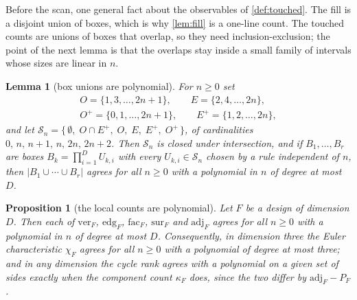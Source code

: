 \documentclass[11pt]{amsart}
\newtheorem{proposition}[theorem]{Proposition}
\newtheorem{lemma}[theorem]{Lemma}
\theoremstyle{definition}
\theoremstyle{remark}
\begin{document}
Before the scan, one general fact about the observables of \cref{def:touched}. The fill is a disjoint union of boxes, which is why \cref{lem:fill} is a one-line count. The touched counts are unions of boxes that overlap, so they need inclusion-exclusion; the point of the next lemma is that the overlaps stay inside a small family of intervals whose sizes are linear in $n$.

\begin{lemma}[box unions are polynomial]
\label{lem:boxes}
For $n \ge 0$ set
\begin{gather*}
  O = \{1,3,\dots,2n+1\},\qquad E = \{2,4,\dots,2n\},\\
  O^{+} = \{0,1,\dots,2n+1\},\qquad E^{+} = \{1,2,\dots,2n\},
\end{gather*}
and let $\mathcal{S}_{n} = \{\,\emptyset,\; O \cap E^{+},\; O,\; E,\; E^{+},\; O^{+}\,\}$, of cardinalities $0,\,n,\,n+1,\,n,\,2n,\,2n+2$. Then $\mathcal{S}_{n}$ is closed under intersection, and if $B_{1},\dots,B_{r}$ are boxes $B_{k} = \prod_{i=1}^{D}U_{k,i}$ with every $U_{k,i} \in \mathcal{S}_{n}$ chosen by a rule independent of $n$, then $|B_{1} \cup \cdots \cup B_{r}|$ agrees for all $n \ge 0$ with a polynomial in $n$ of degree at most $D$.
\end{lemma}

\begin{proposition}[the local counts are polynomial]
\label{prop:topo}
Let $F$ be a design of dimension $D$. Then each of $\mathrm{ver}_{F}$, $\mathrm{edg}_{F}$, $\mathrm{fac}_{F}$, $\mathrm{sur}_{F}$ and $\mathrm{adj}_{F}$ agrees for all $n \ge 0$ with a polynomial in $n$ of degree at most $D$. Consequently, in dimension three the Euler characteristic $\chi_{F}$ agrees for all $n \ge 0$ with a polynomial of degree at most three; and in any dimension the cycle rank agrees with a polynomial on a given set of sides exactly when the component count $\kappa_{F}$ does, since the two differ by $\mathrm{adj}_{F}-P_{F}$.
\end{proposition}
\end{document}
